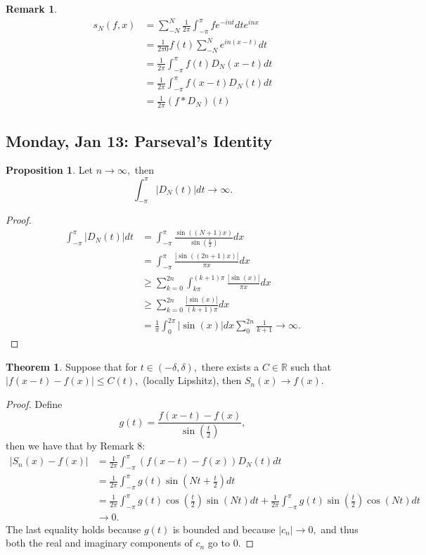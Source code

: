 \documentclass[10pt, oneside]{article}
\newcommand{\bbR}{\mathbb{R}}
\theoremstyle{definition}
\newtheorem{thm}{Theorem}
\newtheorem{prop}{Proposition}
\newtheorem{rem}{Remark}
\begin{document}
 \begin{rem}
 \begin{align*}
     s_N(f,x) &= \sum_{-N}^N \frac{1}{2\pi}\int_{-\pi}^\pi f e^{-int}dt e^{inx}\\
     &= \frac{1}{2\pi0}f(t)\sum_{-N}^N e^{in(x-t)}dt\\
     &= \frac{1}{2\pi}\int_{-\pi}^\pi f(t)D_N(x-t)dt\\
     &= \frac{1}{2\pi}\int_{-\pi}^\pi f(x-t)D_N(t)dt\\
     &= \frac{1}{2\pi}(f \ast D_N)(t)
 \end{align*}
 \end{rem}
 \newpage
\subsection{Monday, Jan 13: Parseval's Identity}
\begin{prop}
Let $n\to \infty,$ then 
\[\int_{-\pi}^\pi|D_N(t)|dt \to \infty.\]
\end{prop}
\begin{proof}
    \begin{align*}
        \int_{-\pi}^\pi |D_N(t)|dt &= \int_{-\pi}^\pi \frac{\sin((N+1)x)}{\sin(\frac{x}{2})}dx\\
        &= \int_{-\pi}^\pi \frac{|\sin((2n + 1)x)|}{\pi x} dx\\
        &\geq \sum_{k=0}^{2n}\int_{k\pi}^{(k+1)\pi}\frac{|\sin(x)|}{\pi x}dx\\
        &\geq \sum_{k=0}^{2n}\frac{|\sin(x)|}{(k+1)\pi}dx\\
        &= \frac{1}{\pi}\int_0^{2\pi}|\sin(x)|dx \sum_{0}^{2n}\frac{1}{k+1} \to \infty.
    \end{align*}
\end{proof}
\begin{thm}
    Suppose that for $t\in (-\delta, \delta),$ there exists a $C\in \bbR$ such that $|f(x-t) - f(x)|\leq C(t),$ (locally Lipshitz), then $S_n(x)\to f(x).$
\end{thm}
\begin{proof}
    Define 
    \[g(t) = \frac{f(x-t) - f(x)}{\sin(\frac{t}{2})},\] then we have that by Remark 8:
    \begin{align*}
        |S_n(x) - f(x)| &= \frac{1}{2\pi}\int_{-\pi}^\pi (f(x-t) - f(x))D_N(t)dt\\
        &= \frac{1}{2\pi}\int_{-\pi}^\pi g(t)\sin(Nt + \frac{t}{2})dt\\
        &= \frac{1}{2\pi}\int_{-\pi}^\pi g(t)\cos(\frac{t}{2})\sin(Nt)dt + \frac{1}{2\pi}\int_{-\pi}^\pi g(t)\sin(\frac{t}{2})\cos(Nt)dt\\
        &\to 0.
    \end{align*}
    The last equality holds because $g(t)$ is bounded and because $|c_n|\to 0,$ and thus both the real and imaginary components of $c_n$ go to $0.$
\end{proof}
\end{document}
